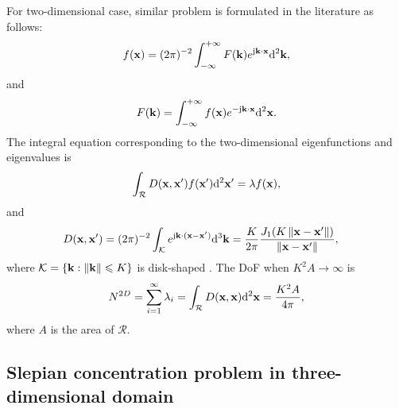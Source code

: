 \documentclass[12pt,draftclsnofoot,journal,onecolumn]{IEEEtran}
\begin{document}
	For two-dimensional case, similar problem is formulated in the literature as follows:
	\begin{equation}
		\begin{aligned}
			f({\bf x})=(2\pi)^{-2}\int_{-\infty}^{+\infty}F({\bf k})e^{{\rm j}{\bf k}\cdot {\bf x}}{\rm d}^2{\bf k},
		\end{aligned}
		\label{eq_2d_fourier}
	\end{equation}
	and
	\begin{equation}
		\begin{aligned}
			F({\bf k}) = \int_{-\infty}^{+\infty}f({\bf x})e^{-{\rm j}{\bf k}\cdot {\bf x}}{\rm d}^2{\bf x}.
		\end{aligned}
	\end{equation}
	The integral equation corresponding to the two-dimensional eigenfunctions and eigenvalues is 
	\begin{equation}
		\begin{aligned}
			\int_{\mathcal{R}}D({\bf x},{\bf x}')f({\bf x}'){\rm d}^2{\bf x}' = \lambda f({\bf x}),
		\end{aligned}
	\end{equation}
	and
	\begin{equation}
		\begin{aligned}
			D({\bf x},{\bf x}') &= (2\pi)^{-2}\int_{\mathcal{K}} e^{{\rm j}{\bf k}\cdot({\bf x}-{\bf x}')}{\rm d}^3{\bf k} = \frac{K}{2\pi} \frac{J_1(K\left\| {\bf x}-{\bf x}' \right\|)}{\left\| {\bf x}-{\bf x}' \right\|},
		\end{aligned}
	\end{equation}
	where $\mathcal{K} = \{{\bf k} : \left\| {\bf k} \right\|\leqslant K\}$ is disk-shaped \cite{beylkin2007grids}. 
	The DoF when $K^2A \rightarrow \infty$ is 
	\begin{equation}
		\begin{aligned}
			N^{2D} = \sum_{i=1}^\infty \lambda_i = \int_{\mathcal{R}}D({\bf x},{\bf x}){\rm d}^2{\bf x} = \frac{K^2A}{4\pi},
		\end{aligned}
		\label{eq_2d_dof}
	\end{equation}
	where $A$ is the area of $\mathcal{R}$. 
	
	\subsection{Slepian concentration problem in three-dimensional domain}
	\label{subsec_3d_slepian}
	
\end{document}
